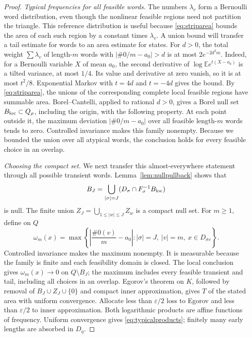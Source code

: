 \documentclass[11pt]{amsart}
\theoremstyle{definition}
\theoremstyle{remark}
\numberwithin{equation}{section}
\begin{document}
\begin{proof}
\emph{Typical frequencies for all feasible words.}
The numbers $\lambda_v$ form a Bernoulli word distribution,
even though the nonlinear feasible regions need not partition
the triangle. This reference distribution is useful because
\eqref{eq:striparea} bounds the area of each such region by a
constant times $\lambda_v$. A union bound will transfer a tail
estimate for words to an area estimate for states. For \(d>0\), the total weight \(\sum\lambda_v\) of length-\(m\)
words with \(|\#0/m-a_0|>d\) is at most \(2e^{-2d^2m}\).
Indeed, for a Bernoulli variable \(X\) of mean \(a_0\),
the second derivative of
\(\log\mathbb E e^{t(X-a_0)}\) is a tilted variance, at most
\(1/4\). Its value and derivative at zero vanish, so it is at most
\(t^2/8\). Exponential Markov with \(t=4d\) and \(t=-4d\)
gives the bound.
By \eqref{eq:striparea}, the unions of the corresponding complete
local feasible regions have summable area. Borel--Cantelli, applied to rational \(d>0\), gives a Borel null set \(B_{\rm loc}\subset Q_\rho\),
including the origin, with the following property. At each point
outside it, the maximum deviation $|\#0/m-a_0|$ over all feasible
length-$m$ words tends to zero. Controlled invariance makes this
family nonempty. Because we bounded the union over all atypical
words, the conclusion holds for every feasible choice in an
overlap.

\smallskip
\emph{Choosing the compact set.}
We next transfer this almost-everywhere statement through all
possible transient words. Lemma~\ref{lem:nullpullback} shows that
\[
B_J=\bigcup_{|\sigma|=J}
       (D_\sigma\cap F_\sigma^{-1}B_{\rm loc})
\]
is null. The finite union
\(Z_J=\bigcup_{1\le|w|\le J}Z_w\) is a compact null set.
For $m\ge1$, define on $Q$
\[
\omega_m(x)=\max\left\{
 \left|\frac{\#0(v)}m-a_0\right|:
 |\sigma|=J,\ |v|=m,\ x\in D_{\sigma v}\right\}.
\]
Controlled invariance makes the maximum nonempty. It is measurable
because the family is finite and each feasibility domain is closed.
The local conclusion gives $\omega_m(x)\to0$ on $Q\setminus B_J$;
the maximum includes every feasible transient and tail, including
all choices in an overlap. Egorov's theorem on $K$, followed by removal of
\(B_J\cup Z_J\cup\{0\}\) and compact inner approximation,
gives \(T\) of the stated area with uniform convergence.
Allocate less than \(\varepsilon/2\) loss to Egorov and less than
\(\varepsilon/2\) to inner approximation.
Both logarithmic products are affine functions of frequency.
Uniform convergence gives \eqref{eq:typicalproducts}; finitely many
early lengths are absorbed in $D_\eta$.


\end{proof}
\end{document}
